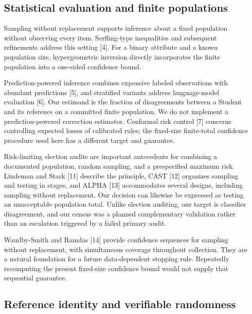 \documentclass[
  10pt,
]{article}
\begin{document}
\hypertarget{statistical-evaluation-and-finite-populations}{%
\subsection{Statistical evaluation and finite
populations}\label{statistical-evaluation-and-finite-populations}}

Sampling without replacement supports inference about a fixed population
without observing every item. Serfling-type inequalities and subsequent
refinements address this setting {[}4{]}. For a binary attribute and a
known population size, hypergeometric inversion directly incorporates
the finite population into a one-sided confidence bound.

Prediction-powered inference combines expensive labeled observations
with abundant predictions {[}5{]}, and stratified variants address
language-model evaluation {[}6{]}. Our estimand is the fraction of
disagreements between a Student and its reference on a committed finite
population. We do not implement a prediction-powered correction
estimator. Conformal risk control {[}7{]} concerns controlling expected
losses of calibrated rules; the fixed-size finite-total confidence
procedure used here has a different target and guarantee.

Risk-limiting election audits are important antecedents for combining a
documented population, random sampling, and a prespecified maximum risk.
Lindeman and Stark {[}11{]} describe the principle, CAST {[}12{]}
organizes sampling and testing in stages, and ALPHA {[}13{]}
accommodates several designs, including sampling without replacement.
Our decision can likewise be expressed as testing an unacceptable
population total. Unlike election auditing, our target is classifier
disagreement, and our census was a planned complementary validation
rather than an escalation triggered by a failed primary audit.

Waudby-Smith and Ramdas {[}14{]} provide confidence sequences for
sampling without replacement, with simultaneous coverage throughout
collection. They are a natural foundation for a future data-dependent
stopping rule. Repeatedly recomputing the present fixed-size confidence
bound would not supply that sequential guarantee.

\hypertarget{reference-identity-and-verifiable-randomness}{%
\subsection{Reference identity and verifiable
randomness}\label{reference-identity-and-verifiable-randomness}}
\end{document}

